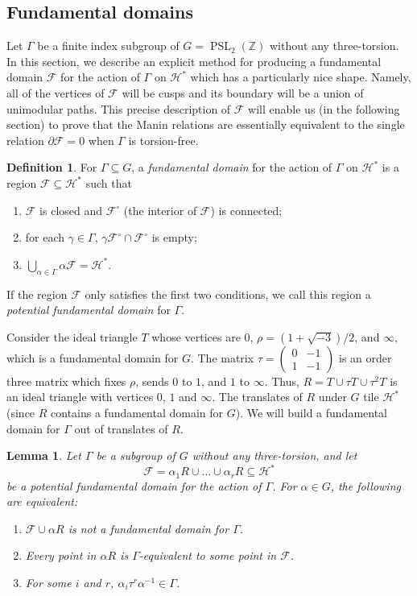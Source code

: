 \documentclass{amsart}
\theoremstyle{plain}
\newtheorem{lemma}[thm]{Lemma}
\theoremstyle{definition}
\newtheorem{defn}[thm]{Definition}
\newcommand{\F}{{\mathcal F}}
\renewcommand{\H}{\mathcal H}
\newcommand{\Z}{{\mathbb Z}}
\DeclareMathOperator{\PSL}{PSL}
\begin{document}
\subsection{Fundamental domains}

Let $\Gamma$ be a finite index subgroup of $G = \PSL_2(\Z)$ without any three-torsion.  In this section, we describe an explicit method for producing a fundamental domain $\F$ for the action of $\Gamma$ on $\H^*$ which has a particularly nice shape.  Namely, all of the vertices of $\F$ will be cusps and its boundary will be a union of unimodular paths.  This precise description of $\F$ will enable us (in the following section) to prove that the Manin relations are essentially equivalent to the single relation $\partial \F = 0$ when $\Gamma$ is torsion-free.

\begin{defn}
\label{def:fd} For $\Gamma \subseteq G$, a {\it fundamental
domain} for the action of $\Gamma$ on $\H^*$ is a region $\F
\subseteq \H^*$ such that
\begin{enumerate}
\item $\F$ is closed and $\F^\circ$ (the interior of $\F$) is connected;
\item for each $\gamma \in \Gamma$, $\gamma \F^\circ \cap \F^\circ$ is empty;
\item $\displaystyle \bigcup_{\alpha \in \Gamma} \alpha \F = \H^*$.
\end{enumerate}
If the region $\F$ only satisfies the first two conditions, we
call this region a {\it potential fundamental domain} for
$\Gamma$.
\end{defn}

Consider the ideal triangle $T$ whose vertices are $0$, $\rho = (1 + \sqrt{-3})/2$, and $\infty$, which is a fundamental domain for $G$. The matrix $\tau =\left(\begin{smallmatrix} 0 & -1 \\ 1 & -1 \end{smallmatrix} \right)$ is an order three matrix which fixes $\rho$, sends $0$ to $1$, and $1$ to $\infty$.  Thus, $R = T \cup \tau T \cup \tau^2 T$ is an ideal triangle with vertices $0$, $1$ and $\infty$.  The translates of $R$ under $G$ tile $\H^*$ (since $R$ contains a fundamental domain for $G$).  We will build a fundamental domain for $\Gamma$ out of translates of $R$.

\begin{lemma}
\label{lemma:extend} Let $\Gamma$ be a subgroup of $G$ without any
three-torsion, and let 
$$\displaystyle \F = \alpha_1 R \cup \dots \cup
\alpha_r R \subseteq \H^*$$ be a potential fundamental domain for the action of $\Gamma$. For $\alpha \in G$, the following are
equivalent:
\begin{enumerate}
\item $\F \cup \alpha R$ is not a fundamental domain for $\Gamma$.
\item
Every point in $\alpha R$ is $\Gamma$-equivalent to some point in
$\F$.
\item
For some $i$ and $r$, $\alpha_i \tau^r \alpha^{-1} \in \Gamma$.
\end{enumerate}
\end{lemma}
\end{document}
